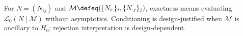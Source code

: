 \begin{remark} \label{rem:fisher-exact-conditional-design-interpretation} \\
For $N=(N_{ij})$ and $\mathcal{M}\defeq(\{N_{i\cdot}\}_i,\{N_{\cdot j}\}_j)$, exactness means evaluating $\mathcal{L}_0(N\mid\mathcal{M})$ without asymptotics. Conditioning is design-justified when $\mathcal{M}$ is ancillary to $H_0$; rejection interpretation is design-dependent.
\end{remark}
